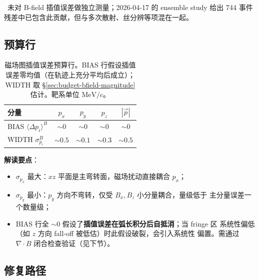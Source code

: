 \StatusReport{}~未对 B-field 插值误差做独立测量；2026-04-17 的 ensemble study 给出
744 事件残差中已包含此贡献，但与多次散射、丝分辨等项混在一起。


\subsection{预算行}
\label{sec:budget-bfield-row}

\begin{table}[H]
  \centering
  \caption{磁场图插值误差预算行。BIAS 行假设插值误差零均值（在轨迹上充分平均后成立）；
           WIDTH 取 §\ref{sec:budget-bfield-magnitude} 估计。靶系单位 $\mathrm{MeV}/c$。}
  \label{tab:bfield-budget}
  \begin{tabular}{lcccc}
    \toprule
    分量 & $p_x$ & $p_y$ & $p_z$ & $|\vec p|$ \\
    \midrule
    BIAS  $\langle \Delta p_i\rangle^{B}$
          & $\sim 0$ & $\sim 0$ & $\sim 0$ & $\sim 0$ \\
    WIDTH $\sigma_{p_i}^{B}$
          & $\sim 0.5$ & $\sim 0.1$ & $\sim 0.3$ & $\sim 0.5$ \\
    \bottomrule
  \end{tabular}
\end{table}

\textbf{解读要点}：
\begin{itemize}
  \item $\sigma_{p_x}$ 最大：$xz$ 平面是主弯转面，磁场扰动直接耦合 $p_x$；
  \item $\sigma_{p_y}$ 最小：$p_y$ 方向不弯转，仅受 $B_x, B_z$ 小分量耦合，量级低于
        主分量误差一个数量级；
  \item BIAS 行全 $\sim 0$ 假设了\textbf{插值误差在弧长积分后自抵消}；当 fringe 区
        系统性偏低（如 $z$ 方向 fall-off 被低估）时此假设破裂，会引入系统性
        偏置。需通过 $\nabla\cdot B$ 闭合检查验证（见下节）。
\end{itemize}

\subsection{修复路径}
\label{sec:budget-bfield-fix}

